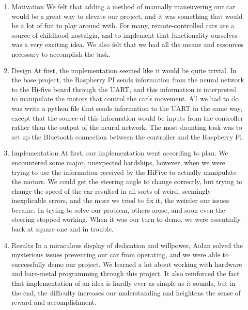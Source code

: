 \documentclass[11pt]{article}
\begin{document}
\begin{enumerate}
\item Motivation
\label{sec:org6cb8027}
We felt that adding a method of manually maneuvering our car would be a great
way to elevate our project, and it was something that would be a lot of fun
to play around with. For many, remote-controlled cars are a source of
childhood nostalgia, and to implement that functionality ourselves was a very
exciting idea. We also felt that we had all the means and resources necessary
to accomplish the task.

\item Design
\label{sec:orgee758d2}
At first, the implementation seemed like it would be quite trivial. In the base
project, the Raspberry PI sends information from the neural network to the
Hi-five board through the UART, and this information is interpreted to
manipulate the motors that control the car’s movement. All we had to do was
write a python file that sends information to the UART in the same way, except
that the source of this information would be inputs from the controller rather
than the output of the neural network. The most daunting task was to set up the
Bluetooth connection between the controller and the Raspberry Pi.

\item Implementation
\label{sec:org769f23a}
At first, our implementation went according to plan. We encountered some
major, unexpected hardships, however, when we were trying to use the
information received by the HiFive to actually manipulate the motors. We
could get the steering angle to change correctly, but trying to change the
speed of the car resulted in all sorts of weird, seemingly inexplicable
errors, and the more we tried to fix it, the weirder our issues became. In
trying to solve our problem, others arose, and soon even the steering stopped
working. When it was our turn to demo, we were essentially back at square one
and in trouble.

\item Results
\label{sec:org7b45eeb}
In a miraculous display of dedication and willpower, Aidan solved the
mysterious issues preventing our car from operating, and we were able to
successfully demo our project. We learned a lot about working with hardware
and bare-metal programming through this project. It also reinforced the fact
that implementation of an idea is hardly ever as simple as it sounds, but in
the end, the difficulty increases our understanding and heightens the sense
of reward and accomplishment.


\end{enumerate}
\end{document}
